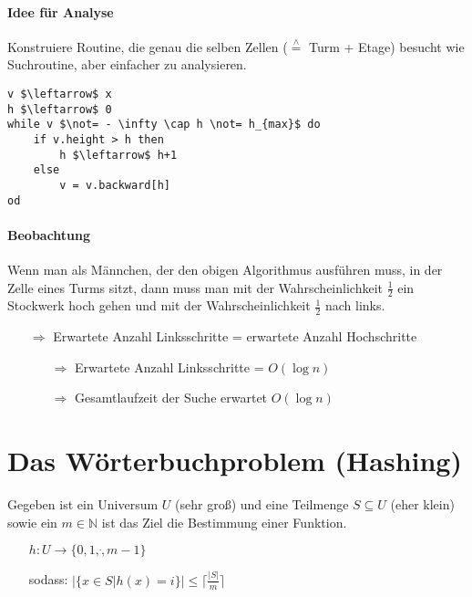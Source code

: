 

\paragraph*{Idee für Analyse} Konstruiere Routine, die genau die selben Zellen ($\overset{\wedge}{=}$ Turm + Etage) besucht wie Suchroutine, aber einfacher zu analysieren.


\begin{lstlisting}[mathescape]
v $\leftarrow$ x
h $\leftarrow$ 0
while v $\not= - \infty \cap h \not= h_{max}$ do
	if v.height > h then
		h $\leftarrow$ h+1
	else
		v = v.backward[h]
od
\end{lstlisting}


\paragraph*{Beobachtung} Wenn man als Männchen, der den obigen Algorithmus ausführen muss, in der Zelle eines Turms sitzt, dann muss man mit der Wahrscheinlichkeit $\frac{1}{2}$ ein Stockwerk hoch gehen und mit der Wahrscheinlichkeit $\frac{1}{2}$ nach links.
\begin{itemize}
	\item[$\Rightarrow$] Erwartete Anzahl Linksschritte = erwartete Anzahl Hochschritte
	\begin{itemize}
		\item[$\Rightarrow$] Erwartete Anzahl Linksschritte = $O(\log n)$
		\item[$\Rightarrow$] Gesamtlaufzeit der Suche erwartet $O(\log n)$
	\end{itemize}
\end{itemize}

\section{Das Wörterbuchproblem (Hashing)}
Gegeben ist ein Universum $U$ (sehr groß) und eine Teilmenge $S \subseteq U$ (eher klein) sowie ein $m \in \mathbb{N}$ ist das Ziel die Bestimmung einer Funktion.
\begin{itemize}
	\item[] $h : U \rightarrow \{ 0,1,\dot,m-1 \}$
	\item[]sodass: $\big| \{ x \in S | h(x) =i \} \big| \leq \lceil\frac{|S|}{m}\rceil $
\end{itemize}

